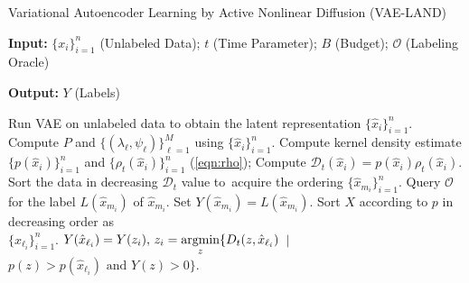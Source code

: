 \documentclass{article}
\newcommand{\argmin}{\operatornamewithlimits{argmin}}%
\def\hx{{\hat x}}
\newcommand{\Dt}{\mathcal{D}_{t}}
\begin{document}
\begin{algorithm}[!htb]
	\caption{\label{alg:VALAND}Variational Autoencoder Learning by Active Nonlinear Diffusion (VAE-LAND)}
	\flushleft
	\flushleft
	\textbf{Input:} $\{x_{i}\}_{i=1}^{n}$ (Unlabeled Data);  $t$ (Time Parameter); $B$ (Budget); $\mathcal{O}$ (Labeling Oracle)
	
	\vspace{3pt}
	
	\textbf{Output:} $Y$ (Labels)
	
		\vspace{3pt}


	\begin{algorithmic}[1]
	\STATE Run VAE on unlabeled data to obtain the latent representation $ \{\hx_{i}\}_{i=1}^{n}$.  
\STATE Compute $P$ and $\{(\lambda_{\ell},\psi_{\ell})\}_{\ell=1}^{M}$ using $ \{\hx_{i}\}_{i=1}^{n}$.
\STATE Compute kernel density estimate $\{p(\hx_{i})\}_{i=1}^{n}$ and $\{\rho_{t}(\hx_{i})\}_{i=1}^{n}$ (\ref{eqn:rho});
	\STATE Compute $\Dt(\hx_{i})=p(\hx_{i})\rho_{t}(\hx_{i})$.  
	\STATE Sort the data in decreasing $\Dt$ value to\ 
	acquire the ordering $\{\hx_{m_{i}}\}_{i=1}^{n}$.
	\STATE Query $\mathcal{O}$ for the label $L(\hx_{m_{i}})$ of $\hx_{m_{i}}$.
	\STATE Set $Y(\hx_{m_{i}})=L(\hx_{m_{i}})$.
	\ENDFOR
	\STATE Sort $X$ according to $p$ in decreasing order as \\ $\{\hx_{\ell_{i}}\}_{i=1}^{n}$.  
	\FOR{$i=1:n$}
	\IF{$Y(\hx_{\ell_{i}})=0$}
	\STATE $Y(\hx_{\ell_{i}})=Y(z_{i}), \, z_{i}=\displaystyle\argmin_{z}\{D_{t}(z,\hx_{\ell_{i}})$\ $| \ $ $p(z)>p(\hx_{\ell_{i}}) \text{ and } Y(z)>0\}$.
	\ENDIF
	\ENDFOR
	\end{algorithmic}
\end{algorithm}
\end{document}
